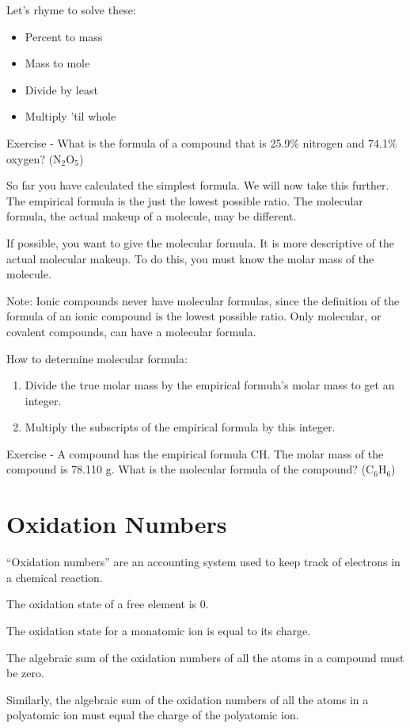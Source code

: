 \documentclass[../hchem.tex]{subfiles}
\begin{document}
Let's rhyme to solve these:
\begin{itemize}
    \item Percent to mass 
    \item Mass to mole 
    \item Divide by least 
    \item Multiply 'til whole 
\end{itemize}

Exercise - What is the formula of a compound that is 25.9\% nitrogen and 74.1\% oxygen? (N$_2$O$_5$)

So far you have calculated the simplest formula. We will now take this further. The empirical formula is the just the 
lowest possible ratio. The molecular formula, the actual makeup of a molecule, may be different.

If possible, you want to give the molecular formula. It is more descriptive of the actual molecular makeup. To do this,
you must know the molar mass of the molecule.

Note: Ionic compounds never have molecular formulas, since the definition of the formula of an ionic compound 
is the lowest possible ratio. Only molecular, or covalent compounds, can have a molecular formula.

How to determine molecular formula:
\begin{enumerate}
    \item Divide the true molar mass by the empirical formula's molar mass to get an integer.
    \item Multiply the subscripts of the empirical formula by this integer.
\end{enumerate}

Exercise - A compound has the empirical formula CH. The molar mass of the compound is 78.110 g. What is the molecular formula of the compound? (C$_6$H$_6$)
\section{Oxidation Numbers}
``Oxidation numbers'' are an accounting system used to keep track of electrons in a chemical reaction.

The oxidation state of a free element is 0.

The oxidation state for a monatomic ion is equal to its charge.

The algebraic sum of the oxidation numbers of all the atoms in a compound must be zero.

Similarly, the algebraic sum of the oxidation numbers of all the atoms in a polyatomic ion must equal the charge of the polyatomic ion.
\end{document}
